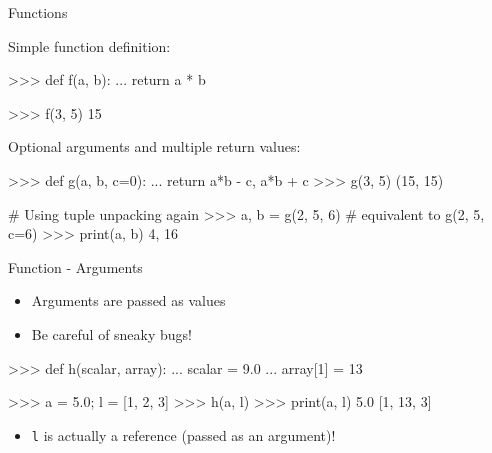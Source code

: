 \documentclass[10pt]{beamer}
\begin{document}
\begin{frame}[fragile]{Functions}

    Simple function definition:

    \begin{pythoncode}
        >>> def f(a, b):
        ...     return a * b

        >>> f(3, 5)
        15
    \end{pythoncode}

    \pause

    Optional arguments and multiple return values:

    \begin{pythoncode}
        >>> def g(a, b, c=0):
        ...     return a*b - c, a*b + c
        >>> g(3, 5)
        (15, 15)

        # Using tuple unpacking again
        >>> a, b = g(2, 5, 6)  # equivalent to g(2, 5, c=6)
        >>> print(a, b)
        4, 16
    \end{pythoncode}

\end{frame}


\begin{frame}[fragile]{Function - Arguments}

    \begin{itemize}
        \item Arguments are passed as values
        \item \pause Be careful of sneaky bugs!
    \end{itemize}

    \pause

    \begin{pythoncode}
        >>> def h(scalar, array):
        ...     scalar = 9.0
        ...     array[1] = 13

        >>> a = 5.0; l = [1, 2, 3]
        >>> h(a, l)
        >>> print(a, l)
        5.0 [1, 13, 3]
    \end{pythoncode}

    \begin{itemize}
        \item \pause \texttt{l} is actually a reference (passed as an argument)!
    \end{itemize}

\end{frame}

\end{document}
